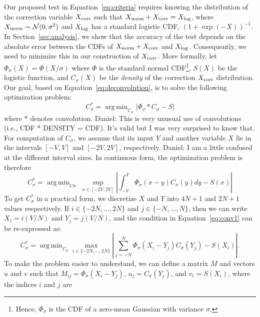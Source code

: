 \documentclass{article}
\DeclareMathOperator*{\argmin}{arg\,min}
\begin{document}
Our proposed test in Equation~\ref{eq:criteria} requires knowing the
distribution of the correction variable $X_{\rm corr}$ such that $X_{\rm norm} +
X_{\rm corr} = X_{\rm log}$, where $X_{\rm norm} \sim \mathcal{N}(0,\sigma^2)$
and $X_{\rm log}$ has a standard logistic CDF, $(1+\exp(-X))^{-1}$. In
Section~\ref{sec:analysis}, we show that the accuracy of the test depends on the
absolute error between the CDFs of $X_{\rm norm} + X_{\rm corr}$ and $X_{\rm
log}$. Consequently, we need to minimize this in our construction of $X_{\rm
corr}$. More formally, let $\Phi_\sigma(X) = \Phi(X/\sigma)$ where $\Phi$ is the
standard normal CDF\footnote{Hence, $\Phi_\sigma$ is the CDF of a zero-mean
Gaussian with variance $\sigma$.}, $S(X)$ be the logistic function, and
$C_{\sigma}(X)$ be the \emph{density} of the correction $X_{\rm corr}$
distribution. Our goal, based on Equation~\ref{eq:deconvolution}, is to solve
the following optimization problem:
\begin{equation}\label{eq:overall_corr_problem}
    C_\sigma^* = \argmin_{C_\sigma} |\Phi_{\sigma} * C_{\sigma} - S|
\end{equation}
where $*$ denotes convolution. {\color{blue} Daniel: This is very unusual use of
convolutions (i.e., CDF * DENSITY = CDF). It's valid but I was very surprised to
know that.} For computation of $C_\sigma$, we assume that its input $Y$ and
another variable $X$ lie in the intervals $[-V,V]$ and $[-2V,2V]$, respectively.
{\color{blue} Daniel: I am a little confused at the different interval sizes.}
In continuous form, the optimization problem is therefore
\begin{equation}\label{eq:conv1}
    C_\sigma^* = \argmin_{C\sigma} \; \sup_{x \in [-2V,2V]}\left|\int_{-V}^{V}\Phi_{\sigma}(x-y) C_{\sigma}(y)dy - S(x)\right|
\end{equation}
To get $C_\sigma^*$ in a practical form, we discretize $X$ and $Y$ into $4N+1$
and $2N+1$ values respectively. If $i \in \{-2N, \ldots, 2N\}$ and $j \in \{-N,
\ldots, N\}$, then we can write $X_i = i(V/N)$ and $Y_j = j(V/N)$, and the
condition in Equation~\ref{eq:conv1} can be re-expressed as:
\begin{equation}\label{eq:conv2}
    C_\sigma^* = \argmin_{C_\sigma} \max_{i \in \{-2N,\ldots,2N\}}\left|\sum_{j = -N}^{N}\Phi_{\sigma}(X_i-Y_j) C_{\sigma}(Y_j) - S(X_i)\right|.
\end{equation}
To make the problem easier to understand, we can define a matrix $M$ and vectors
$u$ and $v$ such that $M_{ij} = \Phi_{\sigma}(X_i-Y_j)$, $u_j =
C_{\sigma}(Y_j)$, and $v_i = S(X_i)$, where the indices $i$ and $j$ are
\end{document}
